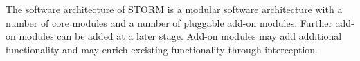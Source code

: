The software architecture of STORM is a modular software architecture with a number of core modules
and a number of pluggable add-on modules. Further add-on modules can be added at a later stage.
Add-on modules may add additional functionality and may enrich excisting functionality through
interception.